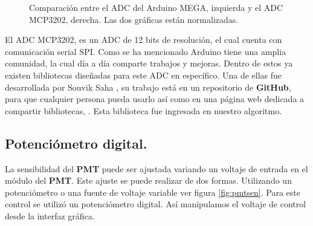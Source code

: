 \begin{figure}[h]
	\centering
	\caption{Comparación entre el ADC del Arduino MEGA, izquierda y el ADC MCP3202, derecha. Las dos gráficas están normalizadas.}
	\label{fig:ledAmari}
\end{figure}
El ADC MCP3202, es un ADC de 12 bits de resolución, el cual cuenta con comunicación serial SPI. 
Como se ha mencionado Arduino tiene una amplia comunidad, la cual día a día comparte trabajos y mejoras. Dentro de estos ya existen bibliotecas diseñadas para este ADC en específico. Una de ellas fue desarrollada por Souvik Saha \cite{MITadcLinkedIn}, su trabajo está en un repositorio de \textbf{GitHub}, \cite{MITadc} para que cualquier persona pueda usarlo así como en una página web dedicada a compartir bibliotecas, \cite{MITadcArduino}. Esta biblioteca fue ingresada en nuestro algoritmo.

\subsection{Potenciómetro digital.} 
La sensibilidad del \textbf{PMT} puede ser ajustada variando un voltaje de entrada en el módulo del \textbf{PMT}. Este ajuste se puede realizar de dos formas. Utilizando un potenciómetro o una fuente de voltaje variable ver figura \ref{fig:pmtsen}. Para este control se utilizó un potenciómetro digital. Así manipulamos el voltaje de control desde la interfaz gráfica.

